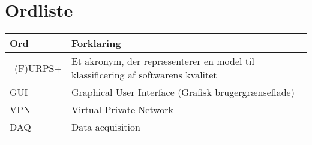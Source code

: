 \chapter{Ordliste}

\begin{longtabu} to 
    Ord &    Forklaring\\
    \toprule \
   (F)URPS+ &    Et akronym, der repræsenterer en model til klassificering af softwarens kvalitet\\
    GUI		&	Graphical User Interface (Grafisk brugergrænseflade)\\
    VPN		&	Virtual Private Network \\
    DAQ		&	Data acquisition \\
 
\label{forkort}
\end{longtabu}